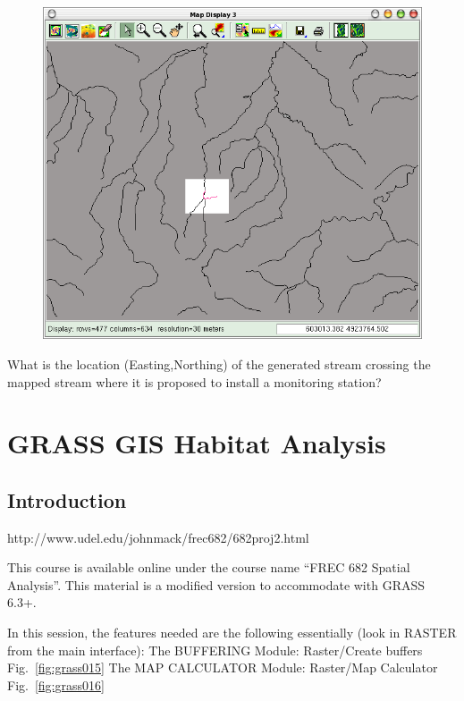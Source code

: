 \begin{figure}[htbp]
   \centering
   \includegraphics[scale=0.35]{grass014.png}
   \caption{}
   \label{fig:grass014}
\end{figure}

What is the location (Easting,Northing) of the generated stream crossing
the mapped stream where it is proposed to install a monitoring
station?

\section{GRASS GIS Habitat Analysis}
\subsection{Introduction}

http://www.udel.edu/johnmack/frec682/682proj2.html

This course is available online under the course name ``FREC 682 Spatial Analysis''. This material is a modified version to accommodate with GRASS 6.3+.

In this session, the features needed are the following essentially (look in RASTER from the main interface): 
The BUFFERING Module:   Raster/Create buffers Fig.~\ref{fig:grass015}
The MAP CALCULATOR Module:   Raster/Map Calculator Fig.~\ref{fig:grass016}

